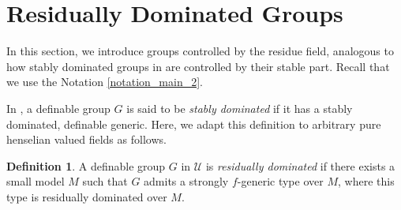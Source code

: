 \documentclass[12pt]{article}
\newcommand{\ACVF}{\mathrm{ACVF}}
\newcommand{\NIP}{\mathrm{NIP}}
\newcommand{\NTP}{\mathrm{NTP_2}}
\newcommand{\0}{\emptyset}
\newcommand{\U}{\mathcal{U}}
\newcommand{\Ualg}{\mathcal{U}_0}
\def\forkindep{\mathrel{\raise0.2ex\hbox{\ooalign{\hidewidth$\vert$\hidewidth\cr\raise-0.9ex\hbox{$\smile$}}}}}
\theoremstyle{plain}%
\newtheorem{notation}[thm]{Notation}
\theoremstyle{definition}
\newtheorem{defn}[thm]{Definition}
\theoremstyle{remark}
\begin{document}
\section{Residually Dominated Groups}\label{Residually dominated groups}

In this section, we introduce groups controlled by the residue field, analogous to how stably dominated groups in \cite{HR19} are controlled by their stable part. Recall that we use the Notation \ref{notation_main_2}. %







In \cite{HR19}, a definable group $G$ is said to be \emph{stably dominated} if it has a stably dominated, definable generic. Here, we adapt this definition to arbitrary pure henselian valued fields as follows.

\begin{defn} A definable group $G$ in $\U$ is \textit{residually dominated} if there exists a small model $M$ such that $G$ admits a strongly $f$-generic type over $M$, where this type is residually dominated over $M$.

   

\end{defn}
\end{document}
